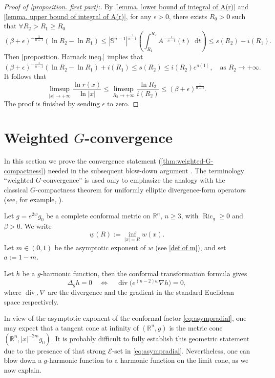 \documentclass[10pt,a4paper]{amsart}
\numberwithin{equation}{section}
\newcommand{\dd}{\mathop{}\!\mathrm{d}}%
\begin{document}
\begin{proof}[Proof of \cref{proposition. first part}:]
    By \cref{lemma. lower bound of integral of A(r)} and \cref{lemma. upper bound of integral of A(r)}, for any $\epsilon>0$, there exists $R_0>0$ such that $\forall R_2>R_1\geq R_0$
    \[
        (\beta+\epsilon)^{-\frac{1}{n-1}}
        (\ln R_2-\ln R_1)
        \leq 
        |\mathbb{S}^{n-1}|^{\frac{1}{n-1}}
        \left(
        \int_{R_1}^{R_2} A^{-\frac{1}{n-1}}(t)\dd t
        \right)
        \leq s(R_2)-i(R_1).
    \]
    Then \cref{proposition. Harnack ineq.} implies that
    \[
        (\beta+\epsilon)^{-\frac{1}{n-1}}(\ln R_2-\ln R_1)
        +i(R_1)
        \leq s(R_2)
        \leq i(R_2)e^{o(1)},\quad  \text{as } R_2\to +\infty.
    \]
    It follows that
    \[
        \limsup_{|x|\to+\infty}\frac{\ln r(x)}{\ln |x|}
        \leq \limsup_{R_2\to +\infty}\frac{\ln R_2}{i(R_2)}\leq (\beta+\epsilon)^{\frac{1}{n-1}}.
    \]
The proof is finished by sending $\epsilon$ to zero.
\end{proof}

\section{Weighted $G$-convergence}
\label{sec:weighted-G}

In this section we prove the convergence statement (\cref{thm:weighted-G-compactness}) needed in the subsequent blow-down argument .  The terminology ``weighted $G$-convergence'' is used only to emphasize the analogy with the classical $G$-compactness theorem for uniformly elliptic divergence-form operators
 (see, for example, \cite[Theorem 3]{ZKON}). 

Let
$g=e^{2w}g_0$
be a complete conformal metric on $\mathbb R^n$, $n\geq 3$, with
$\operatorname{Ric}_g\geq 0$ and $\beta>0$.  We write
\[
    \underline{w}(R):=\inf_{|x|=R}w(x).
\]
Let $m\in(0,1)$ be the asymptotic exponent of $w$ (see  \cref{def of m}), and set
$a:=1-m.$ 

Let $h$ be a $g$-harmonic function, then the conformal transformation formula gives
\[
    \Delta_g h=0
    \quad\Longleftrightarrow\quad
    \operatorname{div}\bigl(e^{(n-2)w}\nabla h\bigr)=0,
\]
where $\operatorname{div},\nabla$ are the divergence and the gradient in the standard Euclidean space respectively. 

In view of the asymptotic exponent of the conformal factor \cref{eq:asympradial}, one may expect that a tangent cone at infinity of $(\mathbb{R}^n, g)$ is the metric cone $(\mathbb{R}^n, |x|^{-2m} g_0)$. It is probably difficult to fully establish this geometric statement due to the presence of that strong 
$\mathcal{E}$-set in \cref{eq:asympradial}.
Nevertheless, one can blow down a $g$-harmonic function to a harmonic function on the limit cone, as we now explain.
\end{document}
